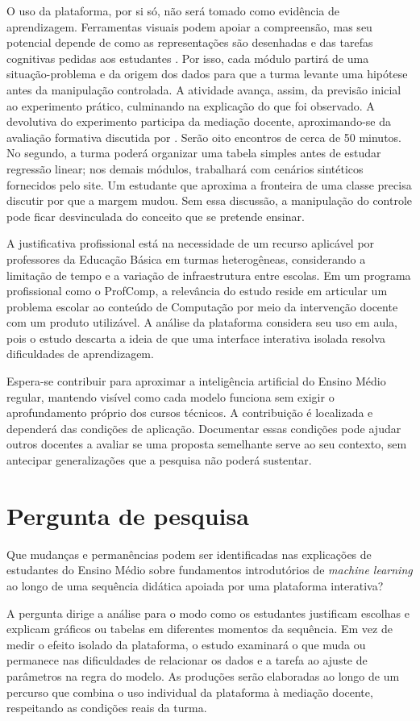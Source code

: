 O uso da plataforma, por si só, não será tomado como evidência de aprendizagem. Ferramentas visuais podem apoiar a compreensão, mas seu potencial depende de como as representações são desenhadas e das tarefas cognitivas pedidas aos estudantes \cite{ainsworth2006deft}. Por isso, cada módulo partirá de uma situação-problema e da origem dos dados para que a turma levante uma hipótese antes da manipulação controlada. A atividade avança, assim, da previsão inicial ao experimento prático, culminando na explicação do que foi observado. A devolutiva do experimento participa da mediação docente, aproximando-se da avaliação formativa discutida por . Serão oito encontros de cerca de 50 minutos. No segundo, a turma poderá organizar uma tabela simples antes de estudar regressão linear; nos demais módulos, trabalhará com cenários sintéticos fornecidos pelo site. Um estudante que aproxima a fronteira de uma classe precisa discutir por que a margem mudou. Sem essa discussão, a manipulação do controle pode ficar desvinculada do conceito que se pretende ensinar.

A justificativa profissional está na necessidade de um recurso aplicável por professores da Educação Básica em turmas heterogêneas, considerando a limitação de tempo e a variação de infraestrutura entre escolas. Em um programa profissional como o ProfComp, a relevância do estudo reside em articular um problema escolar ao conteúdo de Computação por meio da intervenção docente com um produto utilizável. A análise da plataforma considera seu uso em aula, pois o estudo descarta a ideia de que uma interface interativa isolada resolva dificuldades de aprendizagem.

Espera-se contribuir para aproximar a inteligência artificial do Ensino Médio regular, mantendo visível como cada modelo funciona sem exigir o aprofundamento próprio dos cursos técnicos. A contribuição é localizada e dependerá das condições de aplicação. Documentar essas condições pode ajudar outros docentes a avaliar se uma proposta semelhante serve ao seu contexto, sem antecipar generalizações que a pesquisa não poderá sustentar.

\section{Pergunta de pesquisa}

Que mudanças e permanências podem ser identificadas nas explicações de estudantes do Ensino Médio sobre fundamentos introdutórios de \textit{machine learning} ao longo de uma sequência didática apoiada por uma plataforma interativa?

A pergunta dirige a análise para o modo como os estudantes justificam escolhas e explicam gráficos ou tabelas em diferentes momentos da sequência. Em vez de medir o efeito isolado da plataforma, o estudo examinará o que muda ou permanece nas dificuldades de relacionar os dados e a tarefa ao ajuste de parâmetros na regra do modelo. As produções serão elaboradas ao longo de um percurso que combina o uso individual da plataforma à mediação docente, respeitando as condições reais da turma.
